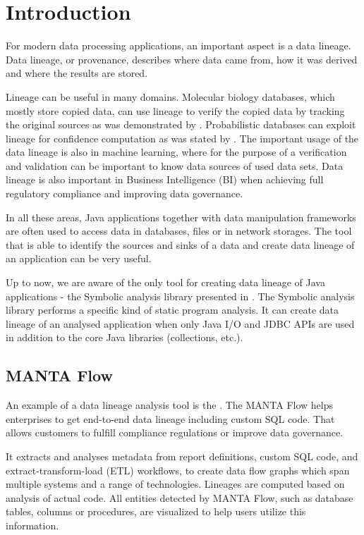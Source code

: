 
\chapter{Introduction}

For modern data processing applications, an important aspect
is a data lineage.
Data lineage, or provenance, describes where data came from,
how it was derived and where the results are stored.

Lineage can be useful in many domains.
Molecular biology databases, which mostly store copied data,
can use lineage to verify the copied data by tracking the original
sources as was demonstrated by \citet{DataLineageInBioInformatics}.
Probabilistic databases can exploit lineage for confidence
computation as was stated by \citet{DataLineageInProbabilisticDatabases}.
The important usage of the data lineage is also in machine learning,
where for the purpose of a verification and validation can be important
to know data sources of used data sets.
Data lineage is also important in Business Intelligence (BI)
when achieving full regulatory compliance and improving data governance.

In all these areas, Java applications together with data manipulation frameworks
are often used to access data in databases, files or in network storages.
The tool that is able to identify the sources and sinks of a data
and create data lineage of an application can be very useful.

Up to now, we are aware of the only tool for creating data lineage of
Java applications - the Symbolic analysis library
presented in \citet{ParizekHybridAnalysis}.
The Symbolic analysis library performs a specific kind of static program analysis.
It can create data lineage of an analysed application when only
Java I/O and JDBC APIs are used in addition to the core
Java libraries (collections, etc.).



\section{MANTA Flow}

An example of a data lineage analysis tool is the \citet{MantaFlow}.
The MANTA Flow helps enterprises to get end-to-end
data lineage including custom SQL code. That allows customers to fulfill
compliance regulations or improve data governance.

It extracts and analyses metadata from report definitions,
custom SQL code, and extract-transform-load (ETL) workflows, to create data flow graphs
which span multiple systems and a range of technologies.
Lineages are computed based on analysis of actual code.
All entities detected by MANTA Flow, such as database tables, columns or procedures,
are visualized to help users utilize this information.


